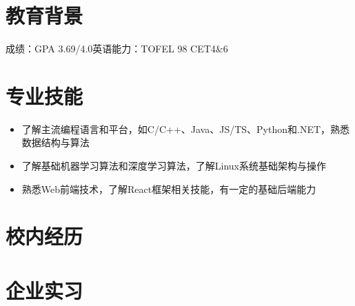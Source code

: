 \documentclass{uniquecv}
\begin{document}

\medskip




\section{教育背景}
成绩：GPA 3.69/4.0\quad 英语能力：TOFEL 98 \quad CET4\&6



\section{专业技能}
\smallskip
\begin{itemize}
  \item 了解主流编程语言和平台，如C/C++、Java、JS/TS、Python和.NET，熟悉数据结构与算法
  \item 了解基础机器学习算法和深度学习算法，了解Linux系统基础架构与操作
  \item 熟悉Web前端技术，了解React框架相关技能，有一定的基础后端能力
\end{itemize}



\section{校内经历}
\smallskip


\section{企业实习}
\smallskip


\end{document}
